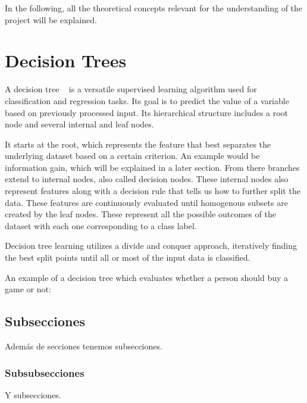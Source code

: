 
In the following, all the theoretical concepts relevant for the understanding of the project will be explained.

\section{Decision Trees}

A decision tree ~\cite{decisiontrees} is a versatile supervised learning algorithm used for classification and regression tasks. Its goal is to predict the value of a variable based on previously processed input. Its hierarchical structure includes a root node and several internal and leaf nodes.

It starts at the root, which represents the feature that best separates the underlying dataset based on a certain criterion. An example would be information gain, which will be explained in a later section. From there branches extend to internal nodes, also called decision nodes. These internal nodes also represent features along with a decision rule that tells us how to further split the data. These features are continuously evaluated until homogenous subsets are created by the leaf nodes. These represent all the possible outcomes of the dataset with each one corresponding to a class label.

Decision tree learning utilizes a divide and conquer approach, iteratively finding the best split points until all or most of the input data is classified.

An example of a decision tree which evaluates whether a person should buy a game or not:

\subsection{Subsecciones}

Además de secciones tenemos subsecciones.

\subsubsection{Subsubsecciones}

Y subsecciones. 

